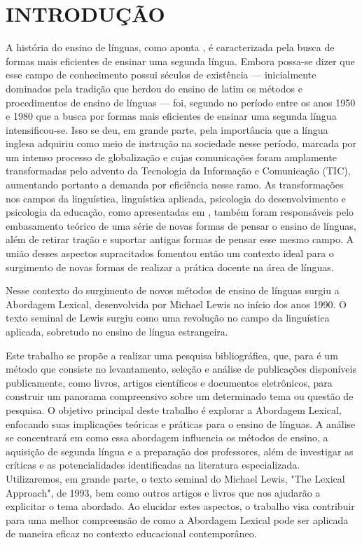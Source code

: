 \section{INTRODUÇÃO}

A história do ensino de línguas, como aponta , é caracterizada pela busca de formas mais eficientes de ensinar uma segunda língua. Embora possa-se dizer que esse campo de conhecimento possui séculos de existência — inicialmente dominados pela tradição que herdou do ensino de latim os métodos e procedimentos de ensino de línguas — foi, segundo no período entre os anos 1950 e 1980 que a busca por formas mais eficientes de ensinar uma segunda língua intensificou-se. Isso se deu, em grande parte, pela importância que a língua inglesa adquiriu como meio de instrução na sociedade nesse período, marcada por um intenso processo de globalização e cujas comunicações foram amplamente transformadas pelo advento da Tecnologia da Informação e Comunicação (TIC), aumentando portanto a demanda por eficiência nesse ramo. As transformações nos campos da linguística, linguística aplicada, psicologia do desenvolvimento e psicologia da educação, como apresentadas em , também foram responsáveis pelo embasamento teórico de uma série de novas formas de pensar o ensino de línguas, além de retirar tração e suportar antigas formas de pensar esse mesmo campo. A união desses aspectos supracitados fomentou então um contexto ideal para o surgimento de novas formas de realizar a prática docente na área de línguas. 

Nesse contexto do surgimento de novos métodos de ensino de línguas surgiu a Abordagem Lexical, desenvolvida por Michael Lewis no início dos anos 1990. O texto seminal de Lewis surgiu como uma revolução no campo da linguística aplicada, sobretudo no ensino de língua estrangeira. 

Este trabalho se propõe a realizar uma pesquisa bibliográfica, que, para  é  um método que consiste no levantamento, seleção e análise de publicações disponíveis publicamente, como livros, artigos científicos e documentos eletrônicos, para construir um panorama compreensivo sobre um determinado tema ou questão de pesquisa. O objetivo principal deste trabalho é explorar a Abordagem Lexical, enfocando suas implicações teóricas e práticas para o ensino de línguas. A análise se concentrará em como essa abordagem influencia os métodos de ensino, a aquisição de segunda língua e a preparação dos professores, além de investigar as críticas e as potencialidades identificadas na literatura especializada. Utilizaremos, em grande parte, o texto seminal do Michael Lewis, "The Lexical Approach", de 1993, bem como outros artigos e livros que nos ajudarão a explicitar o tema abordado. Ao elucidar estes aspectos, o trabalho visa contribuir para uma melhor compreensão de como a Abordagem Lexical pode ser aplicada de maneira eficaz no contexto educacional contemporâneo.


